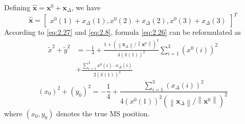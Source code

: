 \documentclass[journal]{IEEEtran}
\begin{document}
Defining $\mathbf{\hat{x}}=\mathbf{x}^0+\mathbf{x}_{\Delta}$, we have 
    \begin{equation}\label{eq:2.27} 
    \mathbf{\hat{x}}\!=\!\begin{bmatrix}x^0\left(1\right)\!+\!x_{\Delta}\left(1\right),x^0\left(2\right)\!+\!x_{\Delta}\left(2\right),x^0\left(3\right)\!+\!x_{\Delta}\left(3\right)\end{bmatrix}^T 
\end{equation}
\indent According to \eqref{eq:2.27} and \eqref{eq:2.8}, formula \eqref{eq:2.26} can be reformulated as
\begin{equation}\label{eq:2.28}
   \begin{aligned}
    {\widetilde{x}}^2+{\widetilde{y}}^2 
   &=-\frac14+\frac{1+\left(\left\|\mathbf{x}_\Delta\right\|/\left\|\mathbf{x}^0\right\|\right)^2}{4\left(\hat{x}\left(1\right)\right)^2}\sum_{i=1}^3\left({x}^0\left(i\right)\right)^2 \\
   & +\frac{\sum_{i=1}^3x^0\left(i\right)\cdot x_{\Delta}\left(i\right)}{2\left(\hat{x}\left(1\right)\right)^2}
   \end{aligned}
\end{equation}
\begin{equation}\label{eq:2.29}
   \left(x_0\right)^2+\left(y_0\right)^2=-\frac14+\frac{\sum_{i=1}^3\left(x_{\Delta}\left(i\right)\right)^2}{4\left(x^0\left(1\right)\right)^2\left(\left\|\mathbf{x}_{\Delta}\right\|/\left\|\mathbf{x}^0\right\|\right)^2}
\end{equation}
where $(x_0,y_0)$ denotes the true MS position.
\end{document}
